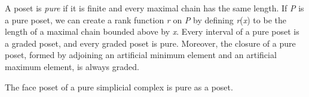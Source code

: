 \documentclass[12pt]{article}
\newcommand{\fm}[1]{{\it #1}}
\begin{document}
A poset is \emph{pure} if it is finite and every maximal chain has the same length.
If \fm{P} is a pure poset, we can create a rank function \fm{r} on \fm{P} by defining
\fm{r}(\fm{x}) to be the length of a maximal chain bounded above by \fm{x}.  Every
interval of a pure poset is a graded poset, and every graded poset is pure.  Moreover,
the closure of a pure poset, formed by adjoining an artificial minimum element and 
an artificial maximum element, is always graded.

The face poset of a pure simplicial complex is pure as a poset.


\end{document}
